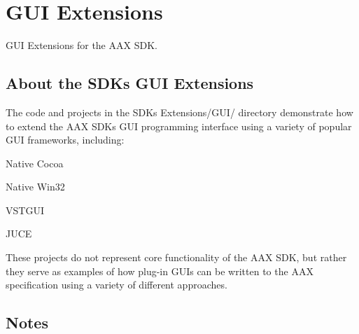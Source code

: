 \hypertarget{a00368}{}\section{G\+U\+I Extensions}
\label{a00368}
G\+U\+I Extensions for the A\+A\+X S\+D\+K. 

\hypertarget{a00368_about}{}\subsection{About the S\+D\+K\textquotesingle{}s G\+U\+I Extensions}\label{a00368_about}
The code and projects in the S\+D\+K\textquotesingle{}s Extensions/\+G\+U\+I/ directory demonstrate how to extend the A\+A\+X S\+D\+K\textquotesingle{}s G\+U\+I programming interface using a variety of popular G\+U\+I frameworks, including\+:


\begin{DoxyItemize}
\item Native Cocoa
\item Native Win32
\item V\+S\+T\+G\+U\+I
\item J\+U\+C\+E
\end{DoxyItemize}

These projects do not represent core functionality of the A\+A\+X S\+D\+K, but rather they serve as examples of how plug-\/in G\+U\+Is can be written to the A\+A\+X specification using a variety of different approaches.\hypertarget{a00368_notes}{}\subsection{Notes}\label{a00368_notes}

